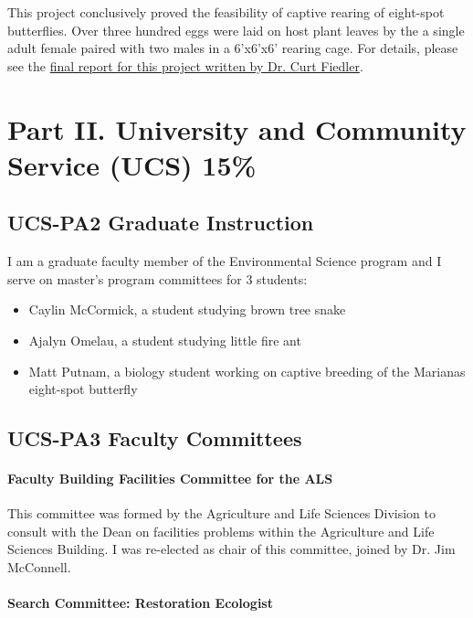 This project conclusively proved the feasibility of captive rearing of eight-spot butterflies. Over three hundred eggs were laid on host plant leaves by the a single adult female paired with two males in a 6’x6’x6’ rearing cage. For details, please see the \href{https://github.com/aubreymoore/Hypollimnas-octocula-conservation/blob/master/TE-19076C_2022%20Annual%20Report.pdf}{final report for this project written by Dr. Curt Fiedler}.



\pagebreak
\section{Part II. University and Community Service (UCS) 15\%}


\subsection{UCS-PA2 Graduate Instruction}

I am a graduate faculty member of the Environmental Science program and I serve on master's program committees for 3 students:

\begin{itemize}
	\item Caylin McCormick, a student studying brown tree snake
	\item Ajalyn Omelau, a student studying little fire ant
	\item Matt Putnam, a biology student working on captive breeding of the Marianas eight-spot butterfly
\end{itemize}

\subsection{UCS-PA3 Faculty Committees}

\paragraph{Faculty Building Facilities Committee for the ALS}

This committee was formed by the Agriculture and Life Sciences Division
to consult with the Dean on facilities problems within the Agriculture
and Life Sciences Building. I was re-elected as chair of this committee, joined by Dr. Jim McConnell.

\paragraph{Search Committee: Restoration Ecologist}

